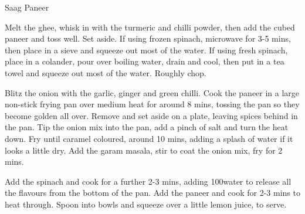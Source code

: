\begin{recipe}[\vegetarian]{Saag Paneer}

    \begin{ingredients}
    \end{ingredients}

    \begin{instructions}
        Melt the ghee, whisk in with the turmeric and chilli powder, then add the cubed paneer and toss well.
        Set aside.
        If using frozen spinach, microwave for 3-5 mins, then place in a sieve and squeeze out most of the water.
        If using fresh spinach, place in a colander, pour over boiling water, drain and cool, then put in a tea towel and squeeze out most of the water.
        Roughly chop.

        Blitz the onion with the garlic, ginger and green chilli.
        Cook the paneer in a large non-stick frying pan over medium heat for around 8 mins, tossing the pan so they become golden all over.
        Remove and set aside on a plate, leaving spices behind in the pan.
        Tip the onion mix into the pan, add a pinch of salt and turn the heat down.
        Fry until caramel coloured, around 10 mins, adding a splash of water if it looks a little dry.
        Add the garam masala, stir to coat the onion mix, fry for 2 mins.

        Add the spinach and cook for a further 2-3 mins, adding 100\ml water to release all the flavours from the bottom of the pan.
        Add the paneer and cook for 2-3 mins to heat through.
        Spoon into bowls and squeeze over a little lemon juice, to serve.
    \end{instructions}
\end{recipe}
